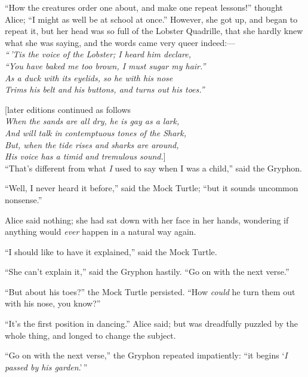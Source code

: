 \documentclass[book, 20pt]{extbook}
\begin{document}
``How the creatures order one about, and make one repeat lessons!''
thought Alice; ``I might as well be at school at once.'' However, she
got up, and began to repeat it, but her head was so full of the Lobster
Quadrille, that she hardly knew what she was saying, and the words came
very queer indeed:---\\
\bigskip
\noindent\emph{``\,'Tis the voice of the Lobster; I heard him declare,\\}
\noindent\emph{``You have baked me too brown, I must sugar my hair.''\\}
\noindent\emph{As a duck with its eyelids, so he with his nose\\}
\noindent\emph{Trims his belt and his buttons, and turns out his toes.''\\}
\bigskip
\strut
{[}later editions continued as follows\\
\bigskip
\noindent\emph{When the sands are all dry, he is gay as a lark,\\}
\noindent\emph{And will talk in contemptuous tones of the Shark,\\}
\noindent\emph{But, when the tide rises and sharks are around,\\}
\noindent\emph{His voice has a timid and tremulous sound.}{]}\\
\bigskip
``That's different from what \emph{I} used to say when I was a child,''
said the Gryphon.

``Well, I never heard it before,'' said the Mock Turtle; ``but it sounds
uncommon nonsense.''

Alice said nothing; she had sat down with her face in her hands,
wondering if anything would \emph{ever} happen in a natural way again.

``I should like to have it explained,'' said the Mock Turtle.

``She can't explain it,'' said the Gryphon hastily. ``Go on with the
next verse.''

``But about his toes?'' the Mock Turtle persisted. ``How \emph{could} he
turn them out with his nose, you know?''

``It's the first position in dancing.'' Alice said; but was dreadfully
puzzled by the whole thing, and longed to change the subject.

``Go on with the next verse,'' the Gryphon repeated impatiently: ``it
begins `\emph{I passed by his garden}.'\,''
\end{document}
